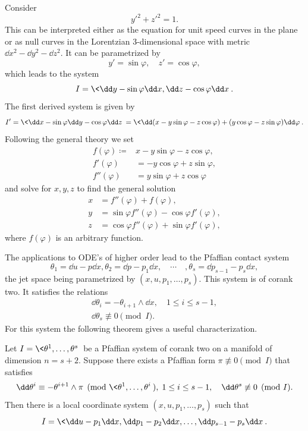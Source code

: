\begin{example}
    Consider 
    \[y'^2+z'^2=1.\]
    This can be interpreted either as the equation for unit speed curves in the plane or as null curves in the Lorentzian $3$-dimensional space with metric $\dd x^2-\dd y^2-\dd z^2$. It can be parametrized by 
    \[y'=\sin\varphi ,\quad z'=\cos\varphi,\]
    which leads to the system 
    \[I=\<\dd y-\sin\varphi \dd x,\dd z-\cos\varphi \dd x\>.\]
    The first derived system is given by 
    \[I'=\<\dd x-\sin\varphi \dd y-\cos\varphi \dd z\>=\<\dd (x-y\sin\varphi-z\cos\varphi)+(y\cos\varphi-z\sin\varphi)\dd\varphi\>.\]
    Following the general theory we set 
    \begin{align}
        f(\varphi)\coloneqq & x-y\sin\varphi-z\cos\varphi,\\
        f'(\varphi)&=-y\cos\varphi+z\sin\varphi,\\
        f''(\varphi)&=y\sin\varphi+z\cos\varphi
    \end{align} 
    and solve for $x,y,z$ to find the general solution
    \begin{align}
        x&= f''(\varphi)+f(\varphi),\\
        y&= \sin\varphi f''(\varphi)-\cos\varphi f'(\varphi),\\
        z&=\cos\varphi f''(\varphi)+\sin\varphi f'(\varphi),
    \end{align}
    where $f(\varphi)$ is an arbitrary function.
\end{example}

The applications to ODE's of higher order lead to the Pfaffian contact system 
\[\theta_1=\dd u-p\dd x,\theta_2=\dd p-p_1\dd x,\quad\cdots\quad ,\theta_{s}=\dd p_{s-1}-p_s\dd x,\]
the jet space being parametrized by $(x,u,p_1,\ldots,p_s)$. This system is of corank two. It satisfies the relations 
\begin{align}
    \dd \theta_i=-\theta_{i+1}\wedge\dd x,\quad 1\leq i\leq s-1,\\
    \dd \theta_s\not\equiv 0 \pmod{I}.
\end{align}
For this system the following theorem gives a useful characterization.

\begin{thm}\label{thm goursat}
    Let $I=\<\theta^1,\ldots,\theta^s\>$ be a Pfaffian system of corank two on a manifold of dimension $n=s+2$. Suppose there exists a Pfaffian form $\pi\not\equiv 0\pmod{I}$ that satisfies 
    \[\dd\theta^i\equiv -\theta^{i+1}\wedge \pi \pmod{\<\theta^1,\ldots,\theta^i\>},\; 1\leq i\leq s-1,\quad \dd\theta^s\not\equiv 0\pmod{I}.\label{eq 34 Bryant}\]
    Then there is a local coordinate system $(x,u,p_1,\ldots,p_s)$ such that 
    \[I=\<\dd u-p_1 \dd x,\dd p_1-p_2\dd x,\ldots, \dd p_{s-1}-p_s\dd x\>.\]
\end{thm}

